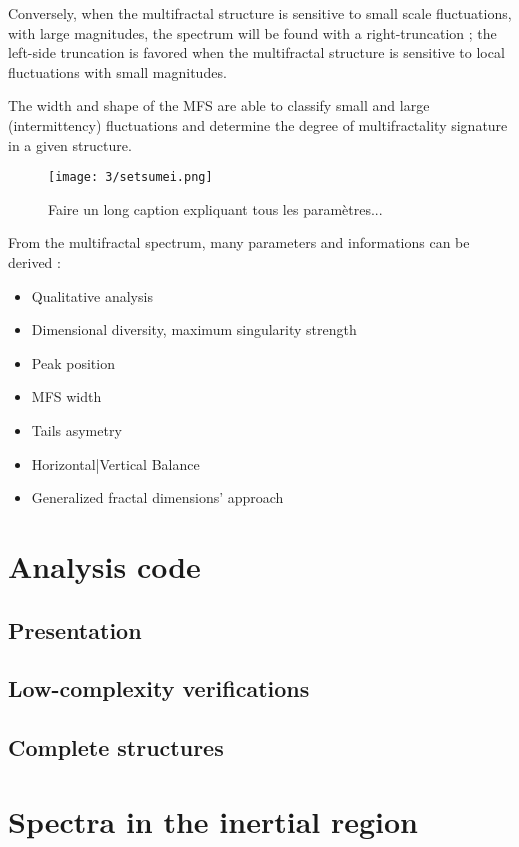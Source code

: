 Conversely, when the multifractal structure is sensitive to small scale fluctuations, with large magnitudes, the spectrum will be found with a right-truncation ; the left-side truncation is favored when the multifractal structure is sensitive to local fluctuations with small magnitudes. 

The width and shape of the MFS are able to classify small and large (intermittency) fluctuations and determine the degree of multifractality signature in a given structure. 

\begin{figure}
\texttt{[image: 3/setsumei.png]}
\caption{Faire un long caption expliquant tous les paramètres...}
\end{figure}
From the multifractal spectrum, many parameters and informations can be derived :
\begin{itemize}
\item{Qualitative analysis}
\item{Dimensional diversity, maximum singularity strength}
\item{Peak position}
\item{MFS width}
\item{Tails asymetry}
\item{Horizontal|Vertical Balance}
\item{Generalized fractal dimensions' approach}
\end{itemize}

\section{Analysis code}
\subsection{Presentation}
\subsection{Low-complexity verifications}
\subsection{Complete structures}

\section{Spectra in the inertial region}

